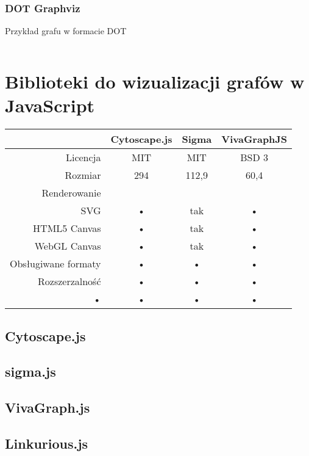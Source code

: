 \subsubsection{DOT Graphviz} 
\begin{listing}[H]
    \caption{Przykład grafu w formacie DOT}
    \inputminted{text}{example.gv}
    \label{lst:dot-example}
\end{listing}

\section{Biblioteki do wizualizacji grafów w JavaScript}

\begin{tabularx}{\textwidth}{|r|c|c|c}
\hline 
 & Cytoscape.js & Sigma & VivaGraphJS \\ 
\hline 
Licencja & MIT & MIT & BSD 3 \\ 
\hline 
Rozmiar & 294 & 112,9 & 60,4 \\ 
\hline 
Renderowanie & & & \\
SVG & • & tak & • \\
HTML5 Canvas & • & tak & • \\
WebGL Canvas & • & tak & • \\ 
\hline 
Obsługiwane formaty & • & • & • \\ 
\hline
Rozszerzalność & • & • & • \\ 
\hline 
• & • & • & • \\ 
\hline 
\end{tabularx} 
\subsection{Cytoscape.js}
\subsection{sigma.js}
\subsection{VivaGraph.js}
\subsection{Linkurious.js}
